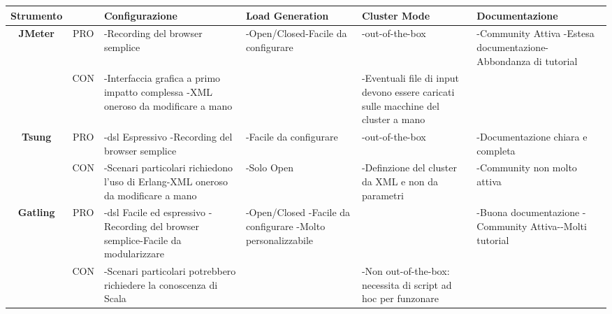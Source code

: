 \begin{table}[H]
\def\arraystretch{2}
\begin{center}
	\begin{tabular}{|c|c|p{3cm}|p{3cm}|p{3cm}|p{3cm}|}
		\hline
		\textbf{Strumento} & & \textbf{Configurazione} & \textbf{Load Generation} & \textbf{Cluster Mode} & \textbf{Documentazione}\\ \hline
		
		\textbf{JMeter} & PRO & -Recording del browser semplice & -Open/Closed\newline-Facile da configurare & -\gls{out-of-the-box} & -Community Attiva \newline -Estesa documentazione\newline-Abbondanza di tutorial \\ \hline
		& CON & -Interfaccia grafica a primo impatto complessa \newline -XML oneroso da modificare a mano & & -Eventuali file di input devono essere caricati sulle macchine del cluster a mano &  \\ \hline\hline
		
		\textbf{Tsung} & PRO & -\gls{dsl} Espressivo \newline-Recording del browser semplice & -Facile da configurare & -\gls{out-of-the-box} & -Documentazione chiara e completa \\ \hline
		& CON & -Scenari particolari richiedono l'uso di Erlang\newline -XML oneroso da modificare a mano & -Solo Open & -Definzione del cluster da XML e non da parametri & -Community non molto attiva  \\ \hline\hline
		
		\textbf{Gatling} & PRO & -\gls{dsl} Facile ed espressivo \newline-Recording del browser semplice\newline-Facile da modularizzare & -Open/Closed  \newline -Facile da configurare \newline -Molto personalizzabile &  & -Buona documentazione \newline-Community Attiva-\newline-Molti tutorial \\ \hline
		& CON & -Scenari particolari potrebbero richiedere la conoscenza di Scala &  & -Non \gls{out-of-the-box}: necessita di script ad hoc per funzonare &   \\ \hline\hline
		

\end{tabular}
\end{center}
\end{table}
